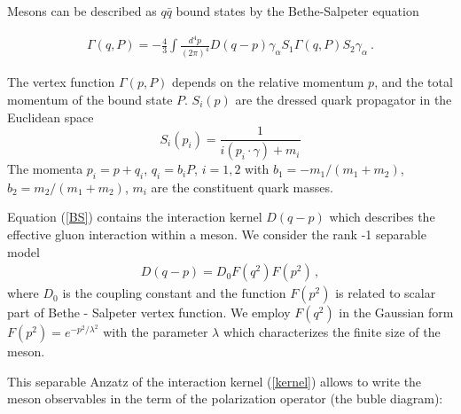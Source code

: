 \documentclass[%
]{ittmm}
\begin{document}
 Mesons can be described as $q\bar{q}$ bound states by 
the Bethe-Salpeter equation

\begin{eqnarray}\label{BS}
  \Gamma (q,P) = -\frac{4}{3} \int \frac{d^4 p}{(2\pi)^4}
  D(q-p) \gamma_\alpha S_1 \Gamma (q,P)
S_2 \gamma_\alpha \  .
\end{eqnarray}

The vertex function $\Gamma (p,P)$ depends on the relative
momentum $p$, and the total momentum of the bound state $P$. 
$S_i(p)$ are the dressed quark propagator in the Euclidean space 
\begin{equation}\label{Eqn:q_prop}
S_i(p_i)=\frac{1}{i (p_i\cdot \gamma) + m_i}
\end{equation}
The momenta $p_i=p+q_i$, $q_i = b_i P$, $i=1,2$ with 
$b_1 =- m_1/(m_1+m_2)$, $b_2 = m_2/(m_1+m_2)$, $m_i$ are the constituent quark masses. 

Equation (\ref{BS}) contains the interaction kernel $D(q-p)$ 
which describes the effective gluon interaction within a meson. 
We consider the rank -1 separable  model 
\begin{eqnarray}\label{kernel}
  D(q-p) = D_0 F(q^2) F(p^2) \, ,
\end{eqnarray}
where $D_0$ is the coupling constant and the function 
$F(p^2)$ is related to scalar part of Bethe - Salpeter  vertex
function. We employ  $F(q^2)$  in the Gaussian form 
$F(p^2)= e^{-p^2/\lambda^2}$ with the parameter $\lambda$ which  characterizes the finite size of the meson. 

This separable Anzatz of the interaction kernel (\ref{kernel}) allows to write the meson observables in the term of the polarization operator (the buble diagram): 


\end{document}
